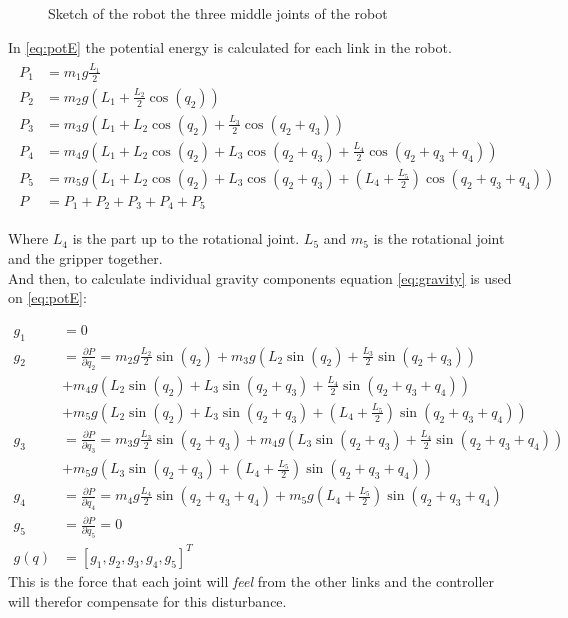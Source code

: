 \begin{figure}[htbp]
    \centering
    
    \caption{Sketch of the robot the three middle joints of the robot}
    \label{draw:pot-rob}
\end{figure}
     
In \eqref{eq:potE} the potential energy is calculated for each link in the robot. 
 \begin{align}
    \begin{split}\label{eq:potE}
        P_1 &= m_1g\frac{L_1}{2}
        \\
        P_2 &= m_2g\left(L_1 + \frac{L_2}{2}\cos{(q_2)}\right)
        \\
        P_3 &= m_3g\left(L_1 +  L_2 \cos{(q_2)} + \frac{L_3}{2}\cos{(q_2 + q_3)} \right)
        \\
        P_4 &= m_4g\left(L_1 +  L_2 \cos{(q_2)} + L_3\cos{(q_2 + q_3)} + \frac{L_4}{2}\cos{(q_2+q_3+q_4)} \right)
        \\
        P_5 &=m_5g\left(L_1 +  L_2 \cos{(q_2)} + L_3\cos{(q_2 + q_3)} + \left(L_4 + \frac{L_5}{2} \right)\cos{(q_2+q_3+q_4)} \right)
        \\
        P &= P_1 + P_2 + P_3 + P_4 + P_5
    \end{split}   
 \end{align}    


 Where $L_4$ is the part up to the rotational joint. $L_5$ and $m_5$ is the rotational joint and the gripper together.  \\
 
 And then, to calculate individual gravity components equation \eqref{eq:gravity} is used on \eqref{eq:potE}:

 \begin{align*}
    g_1 &= 0
    \\
    g_2 &= \frac{\partial P}{\partial q_2} = 
    m_2g\frac{L_2}{2}\sin{(q_2)}+
    m_3g\left( L_2 \sin{(q_2)} + \frac{L_3}{2}\sin{(q_2+q_3)} \right)\\&+
    m_4g\left( L_2 \sin{(q_2)} + L_3\sin{(q_2 + q_3)} + \frac{L_4}{2}\sin{(q_2+q_3+q_4)} \right)\\&+
    m_5g\left( L_2 \sin{(q_2)} + L_3\sin{(q_2 + q_3)} + \left(L_4 + \frac{L_5}{2} \right)\sin{(q_2+q_3+q_4)} \right)
    \\
    g_3 &= \frac{\partial P}{\partial q_3} =
    m_3g\frac{L_3}{2}\sin{(q_2+q_3)} +
    m_4g\left( L_3\sin{(q_2 + q_3)} + \frac{L_4}{2}\sin{(q_2+q_3+q_4)} \right)\\&+
    m_5g\left(  L_3\sin{(q_2 + q_3)} + \left(L_4 + \frac{L_5}{2} \right)\sin{(q_2+q_3+q_4)} \right)
    \\
    g_4 &=\frac{\partial P}{\partial q_4} = 
    m_4g\frac{L_4}{2}\sin{(q_2+q_3+q_4)}+
    m_5g\left(L_4 + \frac{L_5}{2} \right)\sin{(q_2+q_3+q_4)}
    \\
    g_5 &= \frac{\partial P}{\partial q_5} = 0
    \\
    g(q) &= [g_1,g_2,g_3,g_4,g_5]^T
 \end{align*}
This is the force that each joint will \textit{feel} from the other links and the controller will therefor compensate for this disturbance. 


